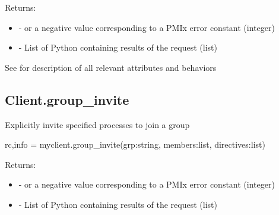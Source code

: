 \begin{arglist}
\end{arglist}

Returns:

\begin{itemize}
    \item {} -  or a negative value corresponding to a PMIx error constant (integer)
    \item {} - List of Python  containing results of the request (list)
\end{itemize}


See  for description of all relevant attributes and behaviors


\subsection{Client.group_invite}

\summary

Explicitly invite specified processes to join a group

\format

\pyspecificstart
\begin{codepar}
rc,info = myclient.group_invite(grp:string, members:list, directives:list)
\end{codepar}
\pyspecificend

\begin{arglist}
\end{arglist}

Returns:

\begin{itemize}
    \item {} -  or a negative value corresponding to a PMIx error constant (integer)
    \item {} - List of Python  containing results of the request (list)
\end{itemize}


